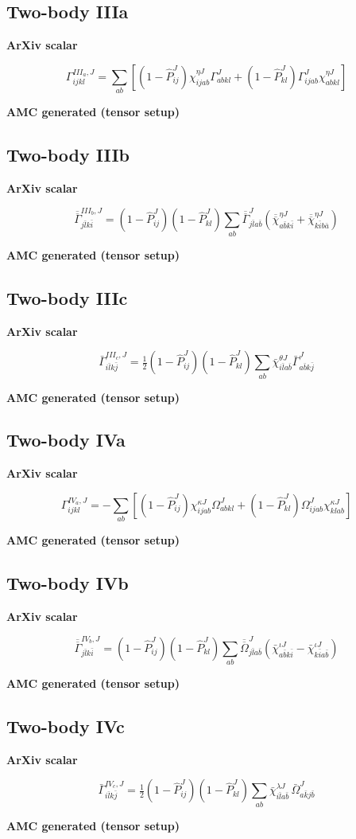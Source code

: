 \documentclass[11pt]{article}
\newcommand{\CompareBlock}[3]{%
\subsection*{#1}
\noindent
\begin{minipage}[t]{0.48\textwidth}
\textbf{ArXiv scalar}
#2
\end{minipage}\hfill
\begin{minipage}[t]{0.48\textwidth}
\textbf{AMC generated (tensor setup)}

\end{minipage}
\vspace{1em}
}
\begin{document}
\CompareBlock{Two-body IIIa}{
\begin{equation*}
\Gamma^{III_a,J}_{ijkl}=\sum_{ab}\left[(1-\hat P^J_{ij})\chi^{\eta J}_{ijab}\Gamma^J_{abkl}+(1-\hat P^J_{kl})\Gamma^J_{ijab}\chi^{\eta J}_{abkl}\right]
\end{equation*}
}{amc_eq_snippets_clean/dc_G3a_tensor_clean_body.tex}

\CompareBlock{Two-body IIIb}{
\begin{equation*}
\overline{\overline\Gamma}^{III_b,J}_{j\bar l k\bar i}=(1-\hat P^J_{ij})(1-\hat P^J_{kl})\sum_{ab}\overline{\overline\Gamma}^J_{j\bar l a\bar b}\left(\overline{\overline\chi}^{\eta J}_{a\bar b k\bar i}+\overline{\overline\chi}^{\eta J}_{k\bar i b\bar a}\right)
\end{equation*}
}{amc_eq_snippets_clean/dc_G3b_tensor_clean_body.tex}

\CompareBlock{Two-body IIIc}{
\begin{equation*}
\bar\Gamma^{III_c,J}_{i\bar l k\bar j}=\tfrac12(1-\hat P^J_{ij})(1-\hat P^J_{kl})\sum_{ab}\bar\chi^{\theta J}_{i\bar l a\bar b}\bar\Gamma^J_{a\bar b k\bar j}
\end{equation*}
}{amc_eq_snippets_clean/dc_G3c_tensor_clean_body.tex}

\CompareBlock{Two-body IVa}{
\begin{equation*}
\Gamma^{IV_a,J}_{ijkl}=-\sum_{ab}\left[(1-\hat P^J_{ij})\chi^{\kappa J}_{ijab}\Omega^J_{abkl}+(1-\hat P^J_{kl})\Omega^J_{ijab}\chi^{\kappa J}_{klab}\right]
\end{equation*}
}{amc_eq_snippets_clean/dc_G4a_tensor_clean_body.tex}

\CompareBlock{Two-body IVb}{
\begin{equation*}
\overline{\overline\Gamma}^{IV_b,J}_{j\bar l k\bar i}=(1-\hat P^J_{ij})(1-\hat P^J_{kl})\sum_{ab}\overline{\overline\Omega}^{J}_{j\bar l a\bar b}\left(\bar\chi^{\iota J}_{a\bar b k\bar i}-\bar\chi^{\iota J}_{k\bar i a\bar b}\right)
\end{equation*}
}{amc_eq_snippets_clean/dc_G4b_tensor_clean_body.tex}

\CompareBlock{Two-body IVc}{
\begin{equation*}
\bar\Gamma^{IV_c,J}_{i\bar l k\bar j}=\tfrac12(1-\hat P^J_{ij})(1-\hat P^J_{kl})\sum_{ab}\bar\chi^{\lambda J}_{i\bar l a\bar b}\,\bar\Omega^J_{a\bar k j\bar b}
\end{equation*}
}{amc_eq_snippets_clean/dc_G4c_tensor_clean_body.tex}
\end{document}

